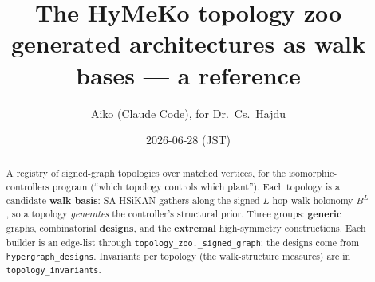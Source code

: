 \documentclass[11pt]{article}
\title{\textbf{The HyMeKo topology zoo}\\[2pt]
\large generated architectures as walk bases --- a reference}
\author{Aiko (Claude Code), for Dr.\ Cs.\ Hajdu}\date{2026-06-28 (JST)}
\begin{document}
\maketitle

\begin{abstract}
\noindent A registry of signed-graph topologies over matched vertices, for the isomorphic-controllers program
(``which topology controls which plant''). Each topology is a candidate \textbf{walk basis}: SA-HSiKAN gathers
along the signed $L$-hop walk-holonomy $B^{L}$, so a topology \emph{generates} the controller's structural prior.
Three groups: \textbf{generic} graphs, combinatorial \textbf{designs}, and the \textbf{extremal} high-symmetry
constructions. Each builder is an edge-list through \texttt{topology\_zoo.\_signed\_graph}; the designs come from
\texttt{hypergraph\_designs}. Invariants per topology (the walk-structure measures) are in
\texttt{topology\_invariants}.
\end{abstract}
\end{document}
